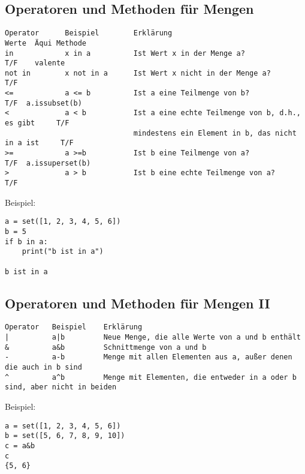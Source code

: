 \documentclass{article}
\begin{document}
\subsection{Operatoren und Methoden für Mengen}
\begin{verbatim}
Operator      Beispiel        Erklärung                                           Werte  Äqui Methode
in            x in a          Ist Wert x in der Menge a?                          T/F    valente   
not in        x not in a      Ist Wert x nicht in der Menge a?                    T/F           
<=            a <= b          Ist a eine Teilmenge von b?                         T/F  a.issubset(b)
<             a < b           Ist a eine echte Teilmenge von b, d.h., es gibt     T/F
                              mindestens ein Element in b, das nicht in a ist     T/F                     
>=            a >=b           Ist b eine Teilmenge von a?                         T/F  a.issuperset(b)
>             a > b           Ist b eine echte Teilmenge von a?                   T/F
\end{verbatim}

\newpage

Beispiel:
\begin{verbatim}
a = set([1, 2, 3, 4, 5, 6])
b = 5
if b in a:
    print("b ist in a")

b ist in a
\end{verbatim}
\subsection{Operatoren und Methoden für Mengen II}
\begin{verbatim}
Operator   Beispiel    Erklärung
|          a|b         Neue Menge, die alle Werte von a und b enthält
&          a&b         Schnittmenge von a und b
-          a-b         Menge mit allen Elementen aus a, außer denen die auch in b sind
^          a^b         Menge mit Elementen, die entweder in a oder b sind, aber nicht in beiden
\end{verbatim}
Beispiel:
\begin{verbatim}
a = set([1, 2, 3, 4, 5, 6])
b = set([5, 6, 7, 8, 9, 10])
c = a&b
c
{5, 6}
\end{verbatim}
\end{document}
